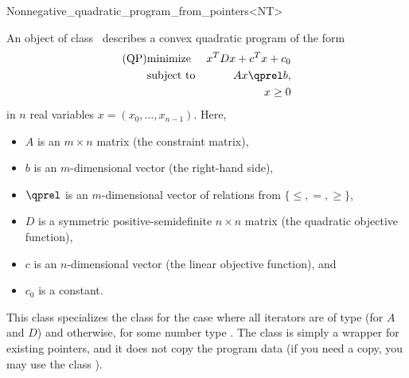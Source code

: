 \begin{ccRefClass}{Nonnegative_quadratic_program_from_pointers<NT>}


\ccDefinition
An object of class \ccRefName\ describes a convex quadratic program of the form
\begin{eqnarray*}
\mbox{(QP)}& \mbox{minimize} & x^{T}Dx+c^{T}x+c_0 \\
&\mbox{subject to}   & Ax\qprel b, \\
&                    & x \geq 0
\end{eqnarray*}
in $n$ real variables $x=(x_0,\ldots,x_{n-1})$.
Here, 
\begin{itemize}
\item $A$ is an $m\times n$ matrix (the constraint matrix), 
\item $b$ is an $m$-dimensional vector (the right-hand side),
\item $\qprel$ is an $m$-dimensional vector of relations 
from $\{\leq, =, \geq\}$, 
\item $D$ is a symmetric positive-semidefinite $n\times n$ matrix (the
  quadratic objective function),
\item $c$ is an $n$-dimensional vector (the linear objective
  function), and 
\item $c_0$ is a constant.
\end{itemize}

This class specializes the class
 for the case where all iterators are of type  (for
$A$ and $D$) and  otherwise, for some number type .
The class is simply a wrapper for 
existing pointers, and it does not copy the program data (if you need
a copy, you may use the class ).

\ccIsModel
{}

\ccTypes
{}

\ccSeeAlso
{}\\
\\

\end{ccRefClass}
